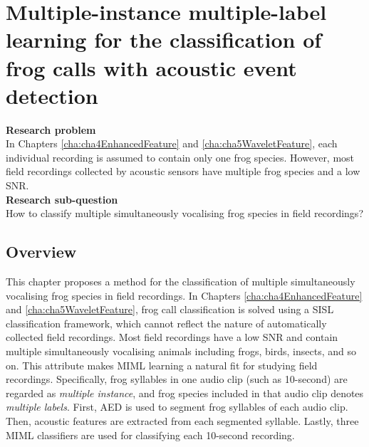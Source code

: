 \chapter{Multiple-instance multiple-label learning for the classification of frog calls with acoustic event detection}
\label{cha:cha6MIML}

\textbf{Research problem}
\\
In Chapters \ref{cha:cha4EnhancedFeature} and \ref{cha:cha5WaveletFeature}, each individual recording is assumed to contain only one frog species. However, most field recordings collected by acoustic sensors have multiple frog species and a low SNR.
\\
\textbf{Research sub-question}
\\
How to classify multiple simultaneously vocalising frog species in field recordings?


\section{Overview}
\label{sec:intro}

This chapter proposes a method for the classification of multiple simultaneously vocalising frog species in field recordings. In Chapters \ref{cha:cha4EnhancedFeature} and \ref{cha:cha5WaveletFeature}, frog call classification is solved using a SISL classification framework, which cannot reflect the nature of automatically collected field recordings. Most field recordings have a low SNR and contain multiple simultaneously vocalising animals including frogs, birds, insects, and so on. This attribute makes MIML learning a natural fit for studying field recordings. Specifically, frog syllables in one audio clip (such as 10-second) are regarded as \textit{multiple instance}, and frog species included in that audio clip denotes \textit{multiple labels}. 
First, AED is used to segment frog syllables of each audio clip.
Then, acoustic features are extracted from each segmented syllable. Lastly, three MIML classifiers are used for classifying each 10-second recording.




